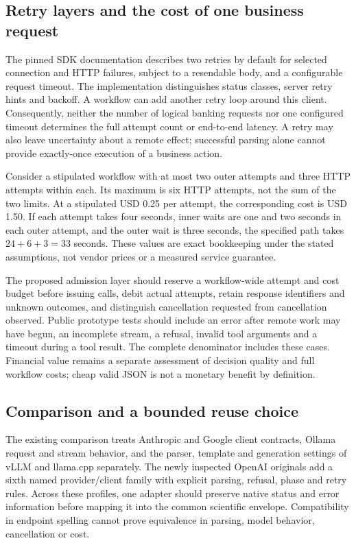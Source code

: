 \subsection{Retry layers and the cost of one business request}
The pinned SDK documentation describes two retries by default for selected connection and HTTP failures,
subject to a resendable body, and a configurable request timeout. The implementation distinguishes status
classes, server retry hints and backoff. A workflow can add another retry loop around this client. Consequently,
neither the number of logical banking requests nor one configured timeout determines the full attempt count or
end-to-end latency. A retry may also leave uncertainty about a remote effect; successful parsing alone cannot
provide exactly-once execution of a business action.\citep{exec28_oa_sdk}

Consider a stipulated workflow with at most two outer attempts and three HTTP attempts within each. Its maximum
is six HTTP attempts, not the sum of the two limits. At a stipulated USD 0.25 per attempt, the corresponding
cost is USD 1.50. If each attempt takes four seconds, inner waits are one and two seconds in each outer attempt,
and the outer wait is three seconds, the specified path takes \(24+6+3=33\) seconds. These values are exact
bookkeeping under the stated assumptions, not vendor prices or a measured service guarantee.\citep{exec28_oa_reference}

The proposed admission layer should reserve a workflow-wide attempt and cost budget before issuing calls,
debit actual attempts, retain response identifiers and unknown outcomes, and distinguish cancellation requested
from cancellation observed. Public prototype tests should include an error after remote work may have begun,
an incomplete stream, a refusal, invalid tool arguments and a timeout during a tool result. The complete
denominator includes these cases. Financial value remains a separate assessment of decision quality and full
workflow costs; cheap valid JSON is not a monetary benefit by definition.

\subsection{Comparison and a bounded reuse choice}
The existing comparison treats Anthropic and Google client contracts, Ollama request and stream behavior,
and the parser, template and generation settings of vLLM and llama.cpp separately. The newly inspected OpenAI
originals add a sixth named provider/client family with explicit parsing, refusal, phase and retry rules.
Across these profiles, one adapter should preserve native status and error information before mapping it into
the common scientific envelope. Compatibility in endpoint spelling cannot prove equivalence in parsing,
model behavior, cancellation or cost.\citep{exec24_backend_anthropic,exec24_backend_google,exec24_backend_ollama,exec24_backend_vllm,exec24_backend_llamacpp,exec28_oa_sdk}

